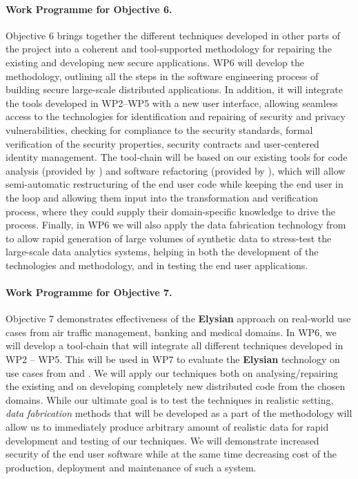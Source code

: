 \documentclass[a4paper,11pt]{article}
\newcommand{\project}[1]{\textbf{#1}\xspace}
\newcommand{\SECURITY}{\project{Elysian}}
\newcommand{\TheProject}{\SECURITY}
\begin{document}
\paragraph{Work Programme for Objective 6.} 

Objective 6  brings together the different techniques developed in other parts of the project into a coherent and tool-supported methodology for repairing the existing and developing new secure applications. WP6 will develop the methodology, outlining all the steps in the software engineering process of building secure large-scale distributed applications. In addition, it will integrate the tools developed in WP2--WP5 with a new user interface, allowing seamless access to the technologies for identification and repairing of security and privacy vulnerabilities, checking for compliance to the security standards, formal verification of the security properties, security contracts and user-centered identity management. The tool-chain will be based on our existing tools for code analysis (provided by \YAGshort{}) and software refactoring (provided by \SAshort{}), which will allow semi-automatic restructuring of the end user code while keeping the end user in the loop and allowing them input into the transformation and verification process, where they could supply their domain-specific knowledge to drive the process. Finally, in WP6 we will also apply the data fabrication technology from \IBMshort{} to allow rapid generation of large volumes of synthetic data to stress-test the large-scale data analytics systems, helping in both the development of the technologies and methodology, and in testing the end user applications.

\paragraph{Work Programme for Objective 7.} 

Objective 7 demonstrates effectiveness of the \TheProject{} approach on real-world use cases from air traffic management, %
banking and medical domains. In WP6, we will develop a tool-chain that will integrate all different techniques developed in WP2 -- WP5. This will be used in WP7 to evaluate the \TheProject{} technology  on use cases from \SOPRAshort{} and \FRQshort{}. We will apply our techniques both on analysing/repairing the existing and on developing completely new distributed code from the chosen domains. While our ultimate goal is to test the techniques in realistic setting, \emph{data fabrication} methods that will be developed as a part of the methodology will allow us to immediately produce arbitrary amount of realistic data for rapid development and testing of our techniques. We will demonstrate increased security of the end user software while at the same time decreasing cost of the production, deployment and maintenance of such a system.
\end{document}
